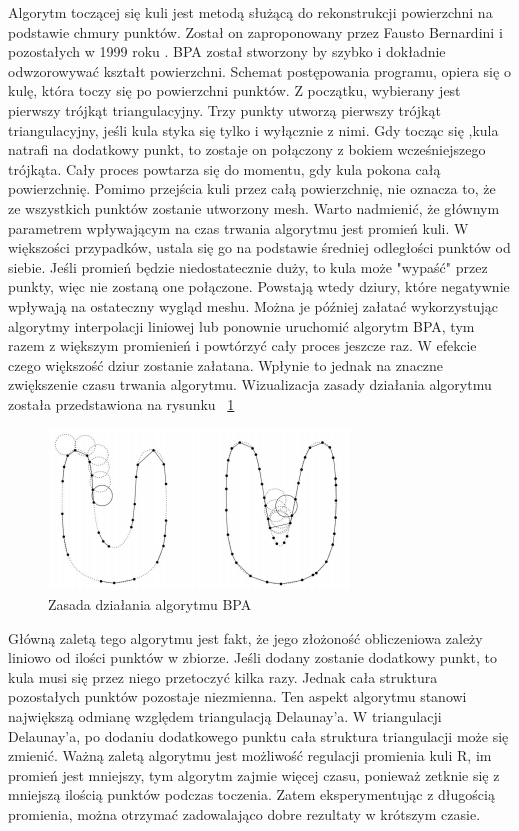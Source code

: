 Algorytm toczącej się kuli jest metodą służącą do rekonstrukcji powierzchni na podstawie chmury punktów. Został on zaproponowany przez Fausto Bernardini i pozostałych w 1999 roku \cite{bernardini1999ball}. BPA został stworzony by szybko i dokładnie odwzorowywać kształt powierzchni. Schemat postępowania programu, opiera się o kulę, która toczy się po powierzchni punktów. Z początku, wybierany jest pierwszy trójkąt triangulacyjny. Trzy punkty utworzą pierwszy trójkąt triangulacyjny, jeśli kula styka się tylko i wyłącznie z nimi. Gdy tocząc się ,kula natrafi na dodatkowy punkt, to zostaje on połączony z bokiem wcześniejszego trójkąta. Cały proces powtarza się do momentu, gdy kula pokona całą powierzchnię. Pomimo przejścia kuli przez całą powierzchnię, nie oznacza to, że ze wszystkich punktów zostanie utworzony mesh. Warto nadmienić, że głównym parametrem wpływającym na czas trwania algorytmu jest promień kuli. W większości przypadków, ustala się go na podstawie średniej odległości punktów od siebie. Jeśli promień będzie niedostatecznie duży, to kula może "wypaść" przez punkty, więc nie zostaną one połączone. Powstają wtedy dziury, które negatywnie wpływają na ostateczny wygląd meshu. Można je później załatać wykorzystując algorytmy interpolacji liniowej lub ponownie uruchomić algorytm BPA, tym razem z większym promienień i powtórzyć cały proces jeszcze raz. W efekcie czego większość dziur zostanie załatana. Wpłynie to jednak na znaczne zwiększenie czasu trwania algorytmu. Wizualizacja zasady działania algorytmu została przedstawiona na rysunku ~\ref{fig:bpaZasada}

\begin{figure}[H]
  \centering
  \includegraphics[scale=0.8]{bpa_zasada.PNG}
  \caption{Zasada działania algorytmu BPA \cite{bernardini1999ball}}   
  \label{fig:bpaZasada}
\end{figure}
Główną zaletą tego algorytmu jest fakt, że jego złożoność obliczeniowa zależy liniowo od ilości punktów w zbiorze. Jeśli dodany zostanie dodatkowy punkt, to kula musi się przez niego przetoczyć kilka razy. Jednak cała struktura pozostałych punktów pozostaje niezmienna. Ten aspekt algorytmu stanowi największą odmianę względem triangulacją Delaunay'a. W triangulacji Delaunay'a, po dodaniu dodatkowego punktu cała struktura triangulacji może się zmienić. Ważną zaletą algorytmu jest możliwość regulacji promienia kuli R, im promień jest mniejszy, tym algorytm zajmie więcej czasu, ponieważ zetknie się z mniejszą ilością punktów podczas toczenia. Zatem eksperymentując z długością promienia, można otrzymać zadowalająco dobre rezultaty w krótszym czasie. 


